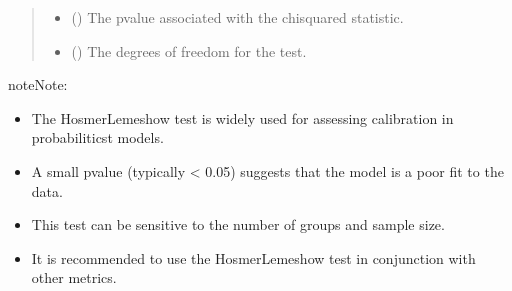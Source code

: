 \documentclass[letterpaper,10pt,english]{sphinxmanual}
\begin{document}
\begin{fulllineitems}
\begin{quote}
\begin{description}
\begin{itemize}
\item {} 
\sphinxAtStartPar
{} () \textendash{} The p\sphinxhyphen{}value associated with the chi\sphinxhyphen{}squared statistic.

\item {} 
\sphinxAtStartPar
{} () \textendash{} The degrees of freedom for the test.

\end{itemize}

\end{description}\end{quote}

\begin{sphinxadmonition}{note}{Note:}\begin{itemize}
\item {} 
\sphinxAtStartPar
The Hosmer\sphinxhyphen{}Lemeshow test is widely used for assessing calibration in probabiliticst models.

\item {} 
\sphinxAtStartPar
A small p\sphinxhyphen{}value (typically \textless{} 0.05) suggests that the model is a poor fit to the data.

\item {} 
\sphinxAtStartPar
This test can be sensitive to the number of groups and sample size.

\item {} 
\sphinxAtStartPar
It is recommended to use the Hosmer\sphinxhyphen{}Lemeshow test in conjunction with other metrics.

\end{itemize}
\end{sphinxadmonition}

\end{fulllineitems}

\end{document}
